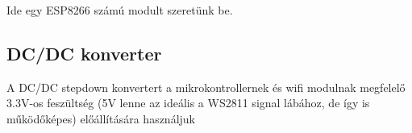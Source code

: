 \documentclass[12pt]{extarticle}
\begin{document}
	Ide egy ESP8266 számú modult szeretünk be.
	
	\subsection{DC/DC konverter}
	
	A DC/DC stepdown konvertert a mikrokontrollernek és wifi modulnak megfelelő 3.3V-os feszültség (5V lenne az ideális a WS2811 signal lábához, de így is működőképes) előállítására használjuk 
	
	
	
	
	
	
	
	
	
	
	
	
	
	
	
	
	
\end{document}
